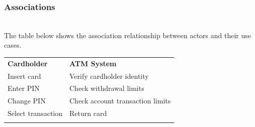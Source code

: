 \subsubsection{Associations}\label{DwYk6UWJaCZK-xTeM8qpA}
\\
The table below shows the association relationship between actors and their use cases.

\begin{center}
{\def\LTcaptype{none} %
\begin{longtable}[]{@{}
>{\raggedright\arraybackslash} p{}
>{\raggedright\arraybackslash} p{}@{}}
\toprule\noalign{}
\endhead
\bottomrule\noalign{}
\endlastfoot
\begin{minipage}[t]{\linewidth}\raggedright
\textbf{Cardholder}
\end{minipage} & \begin{minipage}[t]{\linewidth}\raggedright
\textbf{ATM System}
\end{minipage} \\
\begin{minipage}[t]{\linewidth}\raggedright
Insert card
\end{minipage} & \begin{minipage}[t]{\linewidth}\raggedright
Verify cardholder identity
\end{minipage} \\
\begin{minipage}[t]{\linewidth}\raggedright
Enter PIN
\end{minipage} & \begin{minipage}[t]{\linewidth}\raggedright
Check withdrawal limits
\end{minipage} \\
\begin{minipage}[t]{\linewidth}\raggedright
Change PIN
\end{minipage} & \begin{minipage}[t]{\linewidth}\raggedright
Check account transaction limits
\end{minipage} \\
\begin{minipage}[t]{\linewidth}\raggedright
Select transaction
\end{minipage} & \begin{minipage}[t]{\linewidth}\raggedright
Return card
\end{minipage} \\
\begin{minipage}[t]{\linewidth}\raggedright

\end{minipage}
\end{longtable}}
\end{center}
